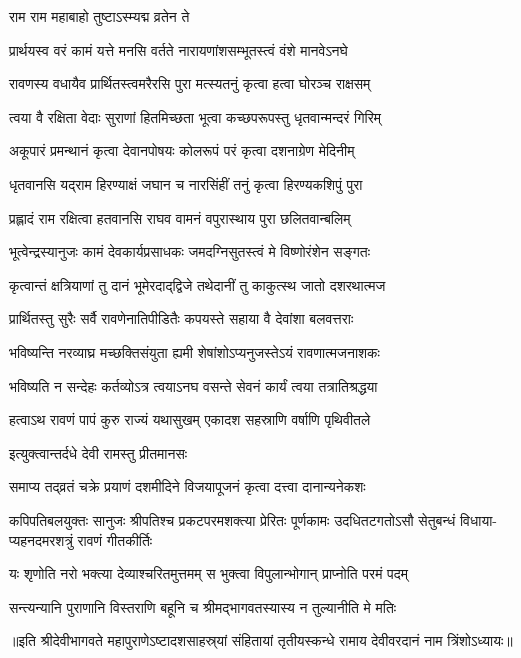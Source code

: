 

\onelineshloka
{राम राम महाबाहो तुष्टाऽस्म्यद्म व्रतेन ते}%

\twolineshloka
{प्रार्थयस्व वरं कामं यत्ते मनसि वर्तते}
{नारायणांशसम्भूतस्त्वं वंशे मानवेऽनघे}%

\twolineshloka
{रावणस्य वधायैव प्रार्थितस्त्वमरैरसि}
{पुरा मत्स्यतनुं कृत्वा हत्वा घोरञ्च राक्षसम्}%

\twolineshloka
{त्वया वै रक्षिता वेदाः सुराणां हितमिच्छता}
{भूत्वा कच्छपरूपस्तु धृतवान्मन्दरं गिरिम्}%

\twolineshloka
{अकूपारं प्रमन्थानं कृत्वा देवानपोषयः}
{कोलरूपं परं कृत्वा दशनाग्रेण मेदिनीम्}%

\twolineshloka
{धृतवानसि यद्‌राम हिरण्याक्षं जघान च}
{नारसिंहीं तनुं कृत्वा हिरण्यकशिपुं पुरा}%

\twolineshloka
{प्रह्लादं राम रक्षित्वा हतवानसि राघव}
{वामनं वपुरास्थाय पुरा छलितवान्बलिम्}%

\twolineshloka
{भूत्वेन्द्रस्यानुजः कामं देवकार्यप्रसाधकः}
{जमदग्निसुतस्त्वं मे विष्णोरंशेन सङ्गतः}%

\twolineshloka
{कृत्वान्तं क्षत्रियाणां तु दानं भूमेरदाद्‌द्विजे}
{तथेदानीं तु काकुत्स्थ जातो दशरथात्मज}%

\twolineshloka
{प्रार्थितस्तु सुरैः सर्वै रावणेनातिपीडितैः}
{कपयस्ते सहाया वै देवांशा बलवत्तराः}%

\twolineshloka
{भविष्यन्ति नरव्याघ्र मच्छक्तिसंयुता ह्यमी}
{शेषांशोऽप्यनुजस्तेऽयं रावणात्मजनाशकः}%

\twolineshloka
{भविष्यति न सन्देहः कर्तव्योऽत्र त्वयाऽनघ}
{वसन्ते सेवनं कार्यं त्वया तत्रातिश्रद्धया}%

\twolineshloka
{हत्वाऽथ रावणं पापं कुरु राज्यं यथासुखम्}
{एकादश सहस्राणि वर्षाणि पृथिवीतले}%



\onelineshloka
{इत्युक्त्वान्तर्दधे देवी रामस्तु प्रीतमानसः}%

\twolineshloka
{समाप्य तद्‌व्रतं चक्रे प्रयाणं दशमीदिने}
{विजयापूजनं कृत्वा दत्त्वा दानान्यनेकशः}%

\fourlineindentedshloka
{कपिपतिबलयुक्तः सानुजः श्रीपतिश्च}
{प्रकटपरमशक्त्या प्रेरितः पूर्णकामः}
{उदधितटगतोऽसौ सेतुबन्धं विधाया-}
{प्यहनदमरशत्रुं रावणं गीतकीर्तिः}%

\twolineshloka
{यः शृणोति नरो भक्त्या देव्याश्चरितमुत्तमम्}
{स भुक्त्वा विपुलान्भोगान् प्राप्नोति परमं पदम्}%

\twolineshloka
{सन्त्यन्यानि पुराणानि विस्तराणि बहूनि च}
{श्रीमद्‌भागवतस्यास्य न तुल्यानीति मे मतिः}%

॥इति श्रीदेवीभागवते महापुराणेऽष्टादशसाहस्र्यां संहितायां तृतीयस्कन्धे रामाय देवीवरदानं नाम त्रिंशोऽध्यायः॥

\closesection